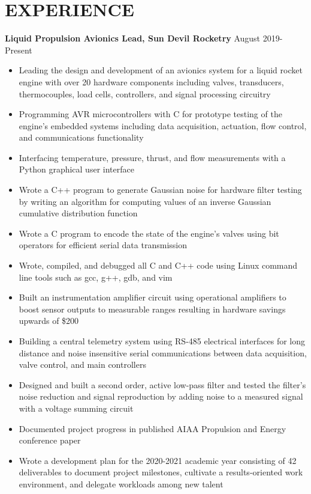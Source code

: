 \documentclass{article}
\begin{document}
\section{EXPERIENCE}
\textbf{Liquid Propulsion Avionics Lead, Sun Devil Rocketry}
\hfill
\vspace{0.5em}
August 2019-Present
\begin{itemize}
	\item{Leading the design and development of an avionics system for a liquid rocket engine with over 20 hardware components including valves, transducers, thermocouples, load cells, controllers, and signal processing circuitry}
	\item{Programming AVR microcontrollers with C for prototype testing of the engine's embedded systems including data acquisition, actuation, flow control, and communications functionality}
	\item{Interfacing temperature, pressure, thrust, and flow measurements with a Python graphical user interface}
	\item{Wrote a C++ program to generate Gaussian noise for hardware filter testing by writing an algorithm for computing values of an inverse Gaussian cumulative distribution function}
	\item{Wrote a C program to encode the state of the engine's valves using bit operators for efficient serial data transmission}
	\item{Wrote, compiled, and debugged all C and C++ code using Linux command line tools such as gcc, g++, gdb, and vim}
	\item{Built an instrumentation amplifier circuit using operational amplifiers to boost sensor outputs to measurable ranges resulting in hardware savings upwards of \$200}
	\item{Building a central telemetry system using RS-485 electrical interfaces for long distance and noise insensitive serial communications between data acquisition, valve control, and main controllers}
	\item{Designed and built a second order, active low-pass filter and tested the filter's noise reduction and signal reproduction by adding noise to a measured signal with a voltage summing circuit}
	\item{Documented project progress in published AIAA Propulsion and Energy conference paper}
	\item{Wrote a development plan for the 2020-2021 academic year consisting of 42 deliverables to document project milestones, cultivate a results-oriented work environment, and delegate workloads among new talent}
\end{itemize}
\end{document}
